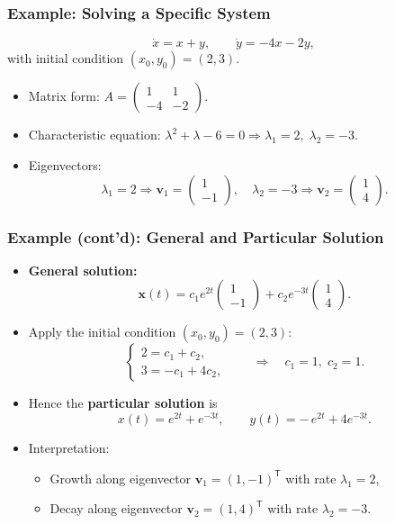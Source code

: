 \documentclass{beamer}
\begin{document}
\begin{frame}
  \frametitle{Example: Solving a Specific System}
  \[
    \dot{x}=x+y, \qquad
    \dot{y}=-4x-2y,
  \]
  with initial condition $(x_0,y_0)=(2,3)$.
  \begin{itemize}
    \item Matrix form:
      \(
        A=\begin{pmatrix} 1 & 1 \\ -4 & -2 \end{pmatrix}.
      \)
    \item Characteristic equation:
      \(
        \lambda^2 + \lambda - 6 = 0 \Rightarrow
        \lambda_1=2,\; \lambda_2=-3.
      \)
    \item Eigenvectors:
      \[
        \lambda_1=2\Rightarrow \mathbf{v}_1=\begin{pmatrix}1\\-1\end{pmatrix},\quad
        \lambda_2=-3\Rightarrow \mathbf{v}_2=\begin{pmatrix}1\\4\end{pmatrix}.
      \]
  \end{itemize}
\end{frame}

\begin{frame}
  \frametitle{Example (cont’d): General and Particular Solution}
  \begin{itemize}
    \item \textbf{General solution:}
      \[
        \mathbf{x}(t)
        = c_1 e^{2t}
          \begin{pmatrix}1\\[-2pt]-1\end{pmatrix}
        + c_2 e^{-3t}
          \begin{pmatrix}1\\[-2pt]4\end{pmatrix}.
      \]
    \item Apply the initial condition $(x_0,y_0)=(2,3)$:
      \[
        \begin{cases}
          2 = c_1 + c_2,\\[3pt]
          3 = -c_1 + 4c_2,
        \end{cases}
        \qquad \Rightarrow \quad c_1 = 1,\; c_2 = 1.
      \]
    \item Hence the \textbf{particular solution} is
      \[
        x(t)=e^{2t}+e^{-3t}, \qquad
        y(t)=-\,e^{2t}+4e^{-3t}.
      \]
    \item Interpretation:
      \begin{itemize}
        \item Growth along eigenvector $\mathbf{v}_1=(1,-1)^\mathsf{T}$ with rate $\lambda_1=2$,
        \item Decay along eigenvector $\mathbf{v}_2=(1,4)^\mathsf{T}$ with rate $\lambda_2=-3$.
      \end{itemize}
  \end{itemize}
\end{frame}
\end{document}
